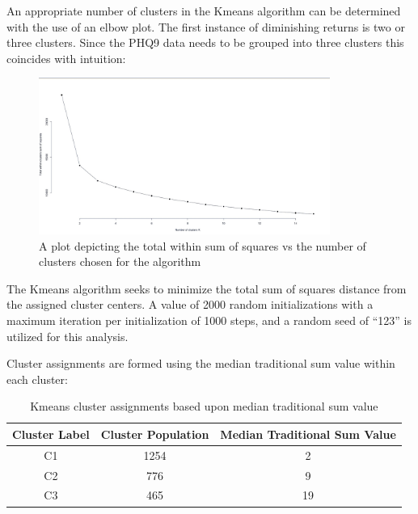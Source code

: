 \documentclass[12pt,]{article}
\begin{document}
An appropriate number of clusters in the Kmeans algorithm can be
determined with the use of an elbow plot. The first instance of
diminishing returns is two or three clusters. Since the PHQ9 data needs
to be grouped into three clusters this coincides with intuition:

\newpage

\begin{figure}[!h]
\begin{center}
\includegraphics[width=0.85\textwidth]{ElbowPlot.jpeg}
\end{center}
\caption[Kmeans Clustering Elbow Plot]{A plot depicting the total within sum of squares vs the number of clusters chosen for the algorithm}
\end{figure}

The Kmeans algorithm seeks to minimize the total sum of squares distance
from the assigned cluster centers. A value of 2000 random
initializations with a maximum iteration per initialization of 1000
steps, and a random seed of ``123'' is utilized for this analysis.

Cluster assignments are formed using the median traditional sum value
within each cluster:

\begin{table}[h!]
\begin{center}
\begin{tabular}{|c|c|c|}
\hline
Cluster Label & Cluster Population & Median Traditional Sum Value \\
\hline
\hline
C1 & 1254 & 2 \\
\hline
C2 & 776 & 9 \\
\hline
C3 & 465 & 19 \\
\hline
\end{tabular}
\end{center}
\caption[Kmeans Cluster assignments]{Kmeans cluster assignments based upon median traditional sum value}
\end{table}
\end{document}
